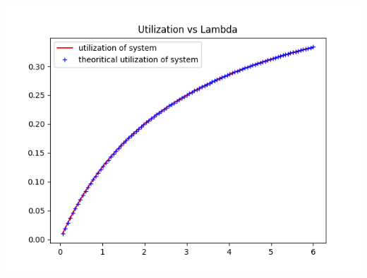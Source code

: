 \documentclass[11pt]{article}
\begin{document}
 \includegraphics{Utilization_L1_K4_M2_U3}
\end{document}
